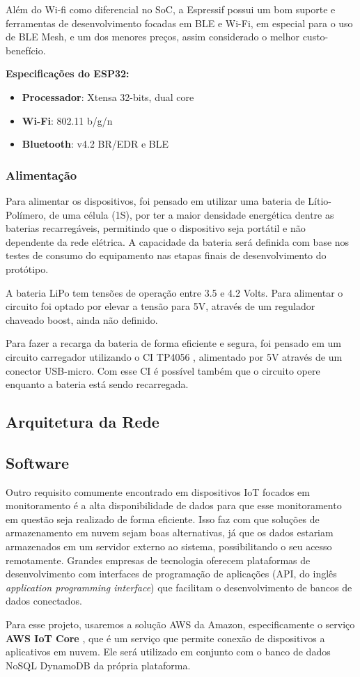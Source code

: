 \documentclass[../monografia.tex]{subfiles}
\begin{document}
Além do Wi-fi como diferencial no SoC, a Espressif possui um bom suporte e ferramentas de desenvolvimento focadas em BLE e Wi-Fi, em especial para o uso de BLE Mesh, e um dos menores preços, assim considerado o melhor custo-benefício. 

\textbf{Especificações do ESP32:} \cite{ESP-datasheet}
\begin{itemize}
\item \textbf{Processador}: Xtensa 32-bits, dual core
\item \textbf{Wi-Fi}: 802.11 b/g/n
\item \textbf{Bluetooth}: v4.2 BR/EDR e BLE
\end{itemize}



\subsubsection{Alimentação}

Para alimentar os dispositivos, foi pensado em utilizar uma bateria de Lítio-Polímero, de uma célula (1S), por ter a maior densidade energética dentre as baterias recarregáveis, permitindo que o dispositivo seja portátil e não dependente da rede elétrica. A capacidade da bateria será definida com base nos testes de consumo do equipamento nas etapas finais de desenvolvimento do protótipo. 

A bateria LiPo tem tensões de operação entre 3.5 e 4.2 Volts. Para alimentar o circuito foi optado por elevar a tensão para 5V, através de um regulador chaveado boost, ainda não definido. 

Para fazer a recarga da bateria de forma eficiente e segura, foi pensado em um circuito carregador utilizando o CI TP4056 \cite{tp4056}, alimentado por 5V através de um conector USB-micro. Com esse CI é possível também que o circuito opere enquanto a bateria está sendo recarregada. 

\subsection{Arquitetura da Rede}

\subsection{Software}
Outro requisito comumente encontrado em dispositivos IoT focados em monitoramento é a alta disponibilidade de dados para que esse monitoramento em questão seja realizado de forma eficiente. Isso faz com que soluções de armazenamento em nuvem sejam boas alternativas, já que os dados estariam armazenados em um servidor externo ao sistema, possibilitando o seu acesso remotamente. Grandes empresas de tecnologia oferecem plataformas de desenvolvimento com interfaces de programação de aplicações (API, do inglês \textit{application programming interface}) que facilitam o desenvolvimento de bancos de dados conectados.

Para esse projeto, usaremos a solução AWS da Amazon, especificamente o serviço \textbf{AWS IoT Core} \cite{aws-iot}, que é um serviço que permite conexão de dispositivos a aplicativos em nuvem. Ele será utilizado em conjunto com o banco de dados NoSQL DynamoDB da própria plataforma.
\end{document}
